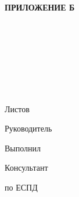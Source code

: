 \begin{ESKDtitlePage}
    \begin{flushright}
        \textbf{ПРИЛОЖЕНИЕ Б} \enspace\enspace
    \end{flushright}
    \begin{center}
        \gpiEdu \\
        \gpiKaf \\
    \end{center}

    \vfill

    \begin{center}
        \gpiTopic \\
    \end{center}

    \vfill

    \begin{center}
        \textbf{\gpiDocTopic} \\
    \end{center}

    \vfill

    \begin{center}
        \gpiCode \\
        Листов \pageref{LastPage} \\
    \end{center}

    \vfill

    \begin{flushright}
        \begin{minipage}[t]{.49\textwidth}
            \begin{minipage}[t]{.75\textwidth}
                \begin{flushright}
                    Руководитель

                    Выполнил

                    Консультант

                    по ЕСПД
                \end{flushright}
            \end{minipage}
        \end{minipage}
        \begin{minipage}[t]{.49\textwidth}
            \begin{flushright}
                \begin{minipage}[t]{.75\textwidth}
                    \gpiTeacherName~\gpiTeacherSurname


\end{minipage}
\end{flushright}
\end{minipage}
\end{flushright}
\end{ESKDtitlePage}
